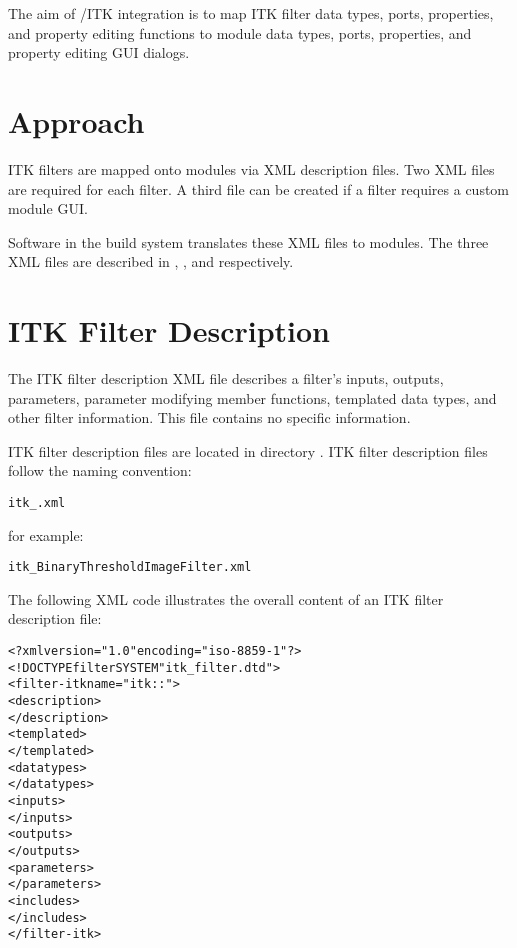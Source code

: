 The aim of \sr{}/ITK integration is to map ITK filter data types,
ports, properties, and property editing functions to \sr{} module data
types, ports, properties, and property editing GUI dialogs.


\section{Approach}
\label{sec:itk_mods:approach}

ITK filters are mapped onto \sr{} modules via XML description files.
Two  XML files are required for each filter.  A third  file can be created
if a filter requires a custom module GUI.

Software in the \sr{} build
system translates these XML files to \sr{} modules.  The three XML
files are described in , , and  respectively.


\section{ITK Filter Description}
\label{sec:itk_mods:itk_filter_desc}

The ITK filter description XML file describes a filter's inputs,
outputs, parameters, parameter modifying member functions, templated
data types, and other filter information.  This file contains no \sr{}
specific information.  

ITK filter description files are located in
directory . 
ITK filter description files follow the naming convention:

\begin{alltt}
  itk\_.xml
\end{alltt}

for example:

\begin{alltt}
  itk\_BinaryThresholdImageFilter.xml
\end{alltt}


The following XML code illustrates the overall content of an ITK
filter description file:

\begin{alltt}
  <?xml version="1.0" encoding="iso-8859-1"?>
  <!DOCTYPE filter SYSTEM "itk_filter.dtd">
  <filter-itk name="itk::">
     <description>
     \velide
     </description>
     <templated>
     \velide
     </templated>
     <datatypes>
     \velide
     </datatypes>
     <inputs>
     \velide
     </inputs>
     <outputs>
     \velide
     </outputs>
     <parameters>
     \velide
     </parameters>
     <includes>
     \velide   
     </includes>
  </filter-itk>
\end{alltt}

